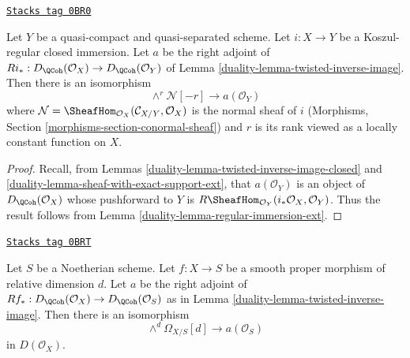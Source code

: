 \begin{lemma}
\label{duality-lemma-regular-immersion}
\href{https://stacks.math.columbia.edu/tag/0BR0}{\texttt{Stacks tag 0BR0}}

Let $Y$ be a quasi-compact and quasi-separated scheme.
Let $i : X \to Y$ be a Koszul-regular closed immersion.
Let $a$ be the right adjoint of
$Ri_* : D_\QCoh(\mathcal{O}_X) \to D_\QCoh(\mathcal{O}_Y)$ of
Lemma \ref{duality-lemma-twisted-inverse-image}. Then there is an isomorphism
$$
\wedge^r\mathcal{N}[-r] \longrightarrow a(\mathcal{O}_Y)
$$
where
$\mathcal{N} = \SheafHom_{\mathcal{O}_X}(\mathcal{C}_{X/Y}, \mathcal{O}_X)$
is the normal sheaf of $i$
(Morphisms, Section \ref{morphisms-section-conormal-sheaf})
and $r$ is its rank viewed as a locally constant
function on $X$.
\end{lemma}

\begin{proof}

Recall, from Lemmas \ref{duality-lemma-twisted-inverse-image-closed}
and \ref{duality-lemma-sheaf-with-exact-support-ext},
that $a(\mathcal{O}_Y)$ is an object of $D_\QCoh(\mathcal{O}_X)$ whose
pushforward to $Y$ is
$R\SheafHom_{\mathcal{O}_Y}(i_*\mathcal{O}_X, \mathcal{O}_Y)$.
Thus the result follows from Lemma \ref{duality-lemma-regular-immersion-ext}.
\end{proof}

\begin{lemma}
\label{duality-lemma-smooth-proper}
\href{https://stacks.math.columbia.edu/tag/0BRT}{\texttt{Stacks tag 0BRT}}

Let $S$ be a Noetherian scheme.
Let $f : X \to S$ be a smooth proper morphism of relative dimension $d$.
Let $a$ be the right adjoint of
$Rf_* : D_\QCoh(\mathcal{O}_X) \to D_\QCoh(\mathcal{O}_S)$ as in
Lemma \ref{duality-lemma-twisted-inverse-image}. Then there is an isomorphism
$$
\wedge^d \Omega_{X/S}[d] \longrightarrow a(\mathcal{O}_S)
$$
in $D(\mathcal{O}_X)$.
\end{lemma}

